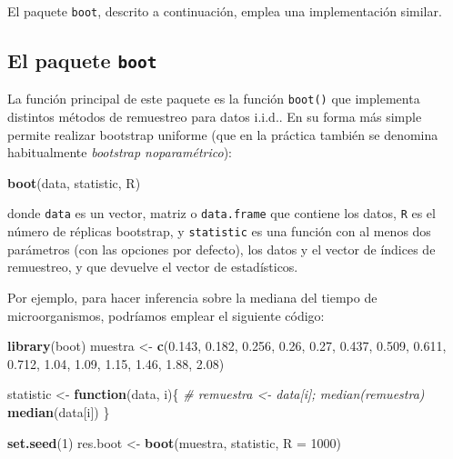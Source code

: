 \documentclass[]{book}
\newenvironment{Shaded}{\begin{snugshade}}{\end{snugshade}}
\newcommand{\KeywordTok}[1]{\textcolor[rgb]{0.13,0.29,0.53}{\textbf{#1}}}
\newcommand{\DataTypeTok}[1]{\textcolor[rgb]{0.13,0.29,0.53}{#1}}
\newcommand{\DecValTok}[1]{\textcolor[rgb]{0.00,0.00,0.81}{#1}}
\newcommand{\FloatTok}[1]{\textcolor[rgb]{0.00,0.00,0.81}{#1}}
\newcommand{\StringTok}[1]{\textcolor[rgb]{0.31,0.60,0.02}{#1}}
\newcommand{\CommentTok}[1]{\textcolor[rgb]{0.56,0.35,0.01}{\textit{#1}}}
\newcommand{\ControlFlowTok}[1]{\textcolor[rgb]{0.13,0.29,0.53}{\textbf{#1}}}
\newcommand{\NormalTok}[1]{#1}
\theoremstyle{break}
\theoremstyle{definition}
\theoremstyle{definition}
\theoremstyle{definition}
\theoremstyle{remark}
\begin{document}
El paquete \texttt{boot}, descrito a continuación, emplea una
implementación similar.

\subsection{\texorpdfstring{El paquete
\texttt{boot}}{El paquete boot}}\label{intro-pkgboot}

La función principal de este paquete es la función \texttt{boot()} que
implementa distintos métodos de remuestreo para datos i.i.d.. En su
forma más simple permite realizar bootstrap uniforme (que en la práctica
también se denomina habitualmente \emph{bootstrap noparamétrico}):

\begin{Shaded}
\begin{Highlighting}[]
\KeywordTok{boot}\NormalTok{(data, statistic, R)}
\end{Highlighting}
\end{Shaded}

donde \texttt{data} es un vector, matriz o \texttt{data.frame} que
contiene los datos, \texttt{R} es el número de réplicas bootstrap, y
\texttt{statistic} es una función con al menos dos parámetros (con las
opciones por defecto), los datos y el vector de índices de remuestreo, y
que devuelve el vector de estadísticos.

Por ejemplo, para hacer inferencia sobre la mediana del tiempo de
microorganismos, podríamos emplear el siguiente código:

\begin{Shaded}
\begin{Highlighting}[]
\KeywordTok{library}\NormalTok{(boot)}
\NormalTok{muestra <-}\StringTok{ }\KeywordTok{c}\NormalTok{(}\FloatTok{0.143}\NormalTok{, }\FloatTok{0.182}\NormalTok{, }\FloatTok{0.256}\NormalTok{, }\FloatTok{0.26}\NormalTok{, }\FloatTok{0.27}\NormalTok{, }\FloatTok{0.437}\NormalTok{, }\FloatTok{0.509}\NormalTok{, }
             \FloatTok{0.611}\NormalTok{, }\FloatTok{0.712}\NormalTok{, }\FloatTok{1.04}\NormalTok{, }\FloatTok{1.09}\NormalTok{, }\FloatTok{1.15}\NormalTok{, }\FloatTok{1.46}\NormalTok{, }\FloatTok{1.88}\NormalTok{, }\FloatTok{2.08}\NormalTok{)}

\NormalTok{statistic <-}\StringTok{ }\ControlFlowTok{function}\NormalTok{(data, i)\{}
  \CommentTok{# remuestra <- data[i]; median(remuestra)}
  \KeywordTok{median}\NormalTok{(data[i])}
\NormalTok{\}}

\KeywordTok{set.seed}\NormalTok{(}\DecValTok{1}\NormalTok{)}
\NormalTok{res.boot <-}\StringTok{ }\KeywordTok{boot}\NormalTok{(muestra, statistic, }\DataTypeTok{R =} \DecValTok{1000}\NormalTok{)}
\end{Highlighting}
\end{Shaded}
\end{document}
